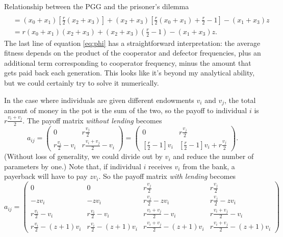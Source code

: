 \documentclass[13pt]{amsart}
\begin{document}
\begin{section}{Relationship between the PGG and the prisoner's dilemma}
\begin{equation}
\begin{split}
        \\
        & = (x_0 + x_1)[\frac{r}{2}(x_2 + x_3)] + (x_2 + x_3)[\frac{r}{2}(x_0 + x_1) + \frac{r}{2} - 1] - (x_1 + x_3)z
        \\
        & = r(x_0 + x_1)(x_2 + x_3) + (x_2 + x_3)(\frac{r}{2} - 1) - (x_1 + x_3)z.
    \end{split}
    \label{eq:phi}
\end{equation}
The last line of equation \ref{eq:phi} has a straightforward interpretation: the average fitness depends on the product of the cooperator and defector frequencies, plus an additional term corresponding to cooperator frequency, minus the amount that gets paid back each generation.
This looks like it's beyond my analytical ability, but we could certainly try to solve it numerically.

In the case where individuals are given different endowments $v_i$ and $v_j$, the total amount of money in the pot is the sum of the two, so the payoff to individual $i$ is $r\frac{v_i + v_j}{2}$.
The payoff matrix \emph{without lending} becomes
\begin{equation}
    a_{ij} =
        \begin{pmatrix}
            0 & r\frac{v_j}{2} \\
            r\frac{v_i}{2} - v_i & r\frac{v_i + v_j}{2} - v_i
        \end{pmatrix}
        =
        \begin{pmatrix}
            0 & r\frac{v_j}{2} \\
            [\frac{r}{2} - 1] v_i & [\frac{r}{2} - 1]v_i + r\frac{v_j}{2}
        \end{pmatrix}.
\end{equation}
(Without loss of generality, we could divide out by $v_i$ and reduce the number of parameters by one.)
Note that, if individual $i$ receives $v_i$ from the bank, a payerback will have to pay $zv_i$.
So the payoff matrix \emph{with lending} becomes
\begin{equation}
    a_{ij} =
    \begin{pmatrix}
        0 & 0 & r\frac{v_j}{2} & r\frac{v_j}{2} \\
        -zv_i & -zv_i & r\frac{v_j}{2} - zv_i & r\frac{v_j}{2} - zv_i \\
        r\frac{v_i}{2} - v_i & r\frac{v_i}{2} - v_i & r\frac{v_i + v_j}{2} - v_i & r\frac{v_i + v_j}{2} - v_i \\
        r\frac{v_i}{2} - (z+1)v_i & r\frac{v_i}{2} - (z+1)v_i  & r\frac{v_i + v_j}{2} - (z+1)v_i & r\frac{v_i + v_j}{2} - (z+1)v_i

\end{pmatrix}
\end{equation}
\end{section}
\end{document}
